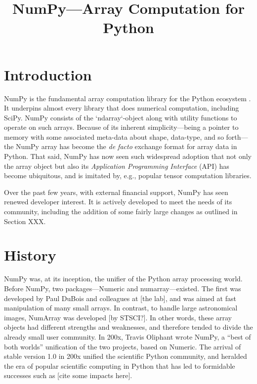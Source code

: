 \documentclass[fleqn,10pt]{wlscirep}
\title{NumPy---Array Computation for Python}
\begin{document}
\flushbottom
\maketitle
\thispagestyle{empty}

\section*{Introduction}

NumPy\cite{vanderwalt2011numpy} is the fundamental array computation library for the Python
ecosystem \cite{dubois2007guest,oliphant2007python,millman2011python,perez2011python}.
It underpins almost every library that does numerical
computation, including SciPy.  NumPy consists of the `ndarray`-object
along with utility functions to operate on such arrays.  Because of
its inherent simplicity—being a pointer to memory with some
associated meta-data about shape, data-type, and so forth—the NumPy
array has become the {\it de facto} exchange format for array data in
Python.  That said, NumPy has now seen such widespread adoption that
not only the array object but also its {\it Application Programming
  Interface} (API) has become ubiquitous, and is imitated by, e.g.,
popular tensor computation libraries.

Over the past few years, with external financial support, NumPy has
seen renewed developer interest.  It is actively developed to meet the
needs of its community, including the addition of some fairly large
changes as outlined in Section XXX.

\section*{History}

NumPy was, at its inception, the unifier of the Python array
processing world.  Before NumPy, two packages—Numeric and
numarray—existed.  The first was developed by Paul DuBois and
colleagues at [the lab], and was aimed at fast manipulation of many
small arrays.  In contrast, to handle large astronomical images,
NumArray was developed [by STSCI?]. In other words, these array
objects had different strengths and weaknesses, and therefore tended
to divide the already small user community.  In 200x, Travis Oliphant
wrote NumPy, a ``best of both worlds'' unification of the two
projects, based on Numeric.  The arrival of stable version 1.0 in 200x unified the scientific Python
community, and heralded the era of popular scientific computing in
Python that has led to formidable successes such as [cite some impacts here].
\end{document}
